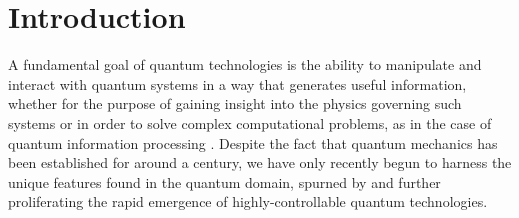 \chapter{Introduction}

A fundamental goal of quantum technologies is the ability to manipulate and interact with quantum systems in a way that generates useful information, whether for the purpose of gaining insight into the physics governing such systems or in order to solve complex computational problems, as in the case of quantum information processing . Despite the fact that quantum mechanics has been established for around a century, we have only recently begun to harness the unique features found in the quantum domain, spurned by and further proliferating the rapid emergence of highly-controllable quantum technologies. 


